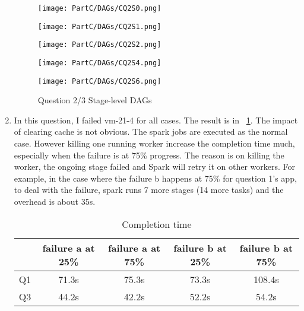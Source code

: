 \begin{enumerate}[label=Question \arabic*.]
    \begin{figure}
        \centering
        \begin{minipage}[t]{0.19\textwidth}
        \texttt{[image: PartC/DAGs/CQ2S0.png]}
        \end{minipage}
        \begin{minipage}[t]{0.19\textwidth}
        \texttt{[image: PartC/DAGs/CQ2S1.png]}
        \end{minipage}
        \begin{minipage}[t]{0.19\textwidth}
        \texttt{[image: PartC/DAGs/CQ2S2.png]}
        \end{minipage}
        \begin{minipage}[t]{0.19\textwidth}
        \texttt{[image: PartC/DAGs/CQ2S4.png]}
        \end{minipage}
        \begin{minipage}[t]{0.19\textwidth}
        \texttt{[image: PartC/DAGs/CQ2S6.png]}
        \end{minipage}
        \caption{Question 2/3 Stage-level DAGs}
        \label{fig:q6}
    \end{figure}
   
    
\item In this question, I failed vm-21-4 for all cases. The result is in \tablename~\ref{tab:q7}. The impact of clearing cache is not obvious. The spark jobs are executed as the normal case. However killing one running worker increase the completion time much, especially when the failure is at 75\% progress. The reason is on killing the worker, the ongoing stage failed and Spark will retry it on other workers. For example, in the case where the failure b happens at 75\% for question 1's app,  to deal with the failure, spark runs 7 more stages (14 more tasks) and the overhead is about 35s.
    
    \begin{table}[!t]
        \centering
        \begin{tabular}{c|c|c|c|c}
        \hline
            & failure a at 25\% & failure a at 75\% & failure b at 25\% & failure b at 75\% \\
        \hline
           Q1 & 71.3s & 75.3s & 73.3s & 108.4s \\
       Q3 & 44.2s & 42.2s & 52.2s & 54.2s \\
        \hline
        \end{tabular}
        \caption{Completion time}
        \label{tab:q7}
    \end{table}
    
    
\end{enumerate}